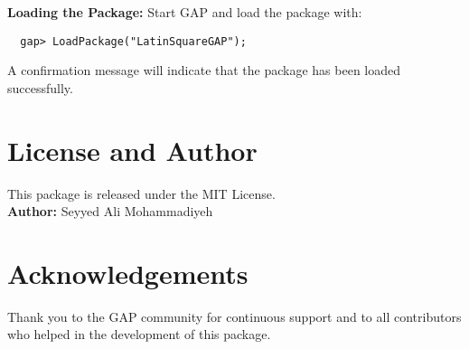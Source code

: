 \documentclass{report}
\begin{document}
\textbf{Loading the Package:}  
Start GAP and load the package with:
\begin{verbatim}
  gap> LoadPackage("LatinSquareGAP");
\end{verbatim}
A confirmation message will indicate that the package has been loaded successfully.

\chapter{License and Author}
This package is released under the MIT License.\\[1mm]
\textbf{Author:} Seyyed Ali Mohammadiyeh

\chapter{Acknowledgements}
Thank you to the GAP community for continuous support and to all contributors who helped in the development of this package.
\end{document}
